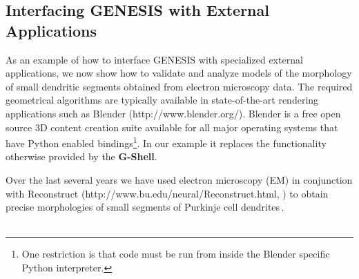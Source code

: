 \documentclass[10pt]{article}
\begin{document}
\subsection*{Interfacing GENESIS with External Applications}


As an example of how to interface GENESIS with specialized external
applications, we now show how to validate and analyze models of the
morphology of small dendritic segments obtained from electron
microscopy data.  The required geometrical algorithms are typically
available in state-of-the-art rendering applications such as  Blender
(http://www.blender.org/). Blender is a free open source 3D content creation
suite available for all major operating systems that have Python
enabled bindings\footnote{One restriction is that code must be run
  from inside the Blender specific Python interpreter.}. In our
example it replaces the functionality otherwise provided by the
{\bf G-Shell}.

Over the last several years we have used electron microscopy (EM) in conjunction
with Reconstruct (http://www.bu.edu/neural/Reconstruct.html, \cite{jc05:_recon}) to obtain precise
morphologies of small segments of Purkinje cell
dendrites\,\cite{huo09:_purkin, cornelis08:_model_neuros_genes}.\\

 \\
\end{document}
